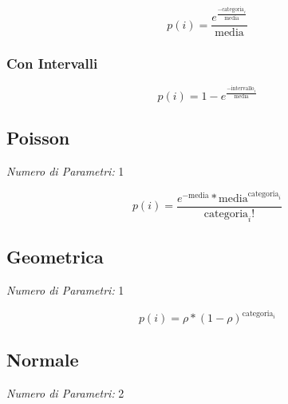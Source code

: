 \[
      p(i) = \frac{e^{\frac{- \text{categoria}_i}{\text{media}}}}{\text{media}}
\]

\subsubsection{Con Intervalli}

\[
      p(i) = 1 - e^{\frac{- \text{intervallo}_i}{\text{media}}}
\]

\subsection{Poisson}

\textit{Numero di Parametri:} 1

\[
      p(i) = \frac{e^{- \text{media}} * \text{media}^{\text{categoria}_i}}{\text{categoria}_i !}
\]

\subsection{Geometrica}

\textit{Numero di Parametri:} 1

\[
      p(i) = \rho * (1 - \rho)^{\text{categoria}_i}
\]

\subsection{Normale}

\textit{Numero di Parametri:} 2